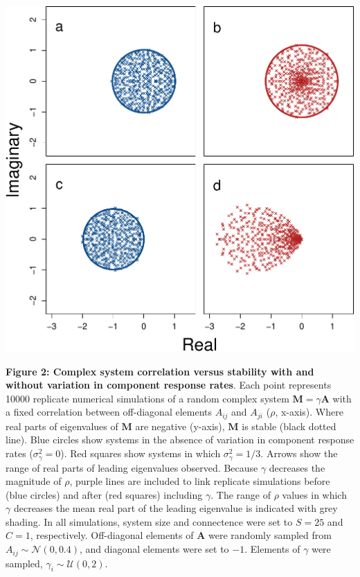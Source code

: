 \documentclass[]{article}
\begin{document}
\includegraphics{ms_files/figure-latex/unnamed-chunk-9-1.pdf}

\clearpage

\textbf{Figure 2: Complex system correlation versus stability with and
without variation in component response rates}. Each point represents
10000 replicate numerical simulations of a random complex system
\(\mathbf{M} = \gamma \mathbf{A}\) with a fixed correlation between
off-diagonal elements \(A_{ij}\) and \(A_{ji}\) (\(\rho\), x-axis).
Where real parts of eigenvalues of \(\mathbf{M}\) are negative (y-axis),
\(\mathbf{M}\) is stable (black dotted line). Blue circles show systems
in the absence of variation in component response rates
(\(\sigma^{2}_{\gamma} = 0\)). Red squares show systems in which
\(\sigma^{2}_{\gamma} = 1/3\). Arrows show the range of real parts of
leading eigenvalues observed. Because \(\gamma\) decreases the magnitude
of \(\rho\), purple lines are included to link replicate simulations
before (blue circles) and after (red squares) including \(\gamma\). The
range of \(\rho\) values in which \(\gamma\) decreases the mean real
part of the leading eigenvalue is indicated with grey shading. In all
simulations, system size and connectence were set to \(S = 25\) and
\(C = 1\), respectively. Off-diagonal elements of \(\textbf{A}\) were
randomly sampled from \(A_{ij} \sim \mathcal{N}(0, 0.4)\), and diagonal
elements were set to \(-1\). Elements of \(\gamma\) were sampled,
\(\gamma_{i} \sim \mathcal{U}(0, 2)\).
\end{document}
